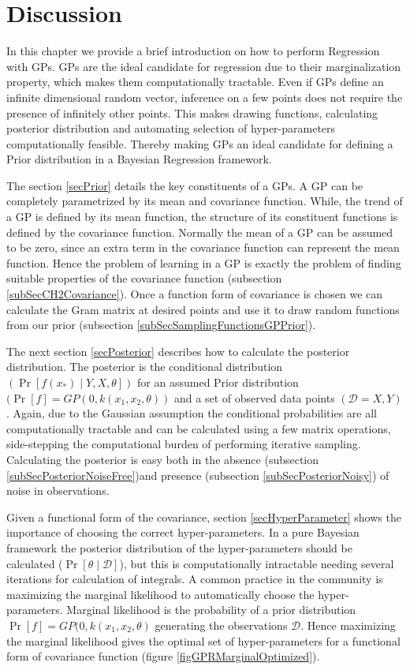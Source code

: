 \section{Discussion}\label{secCH2Discussion}
In this chapter we provide a brief introduction on how to perform Regression with GPs. GPs are the ideal candidate for regression due to their marginalization property, which makes them computationally tractable. Even if GPs define an infinite dimensional random vector, inference on a few points does not require the presence of infinitely other points. This makes drawing functions, calculating posterior distribution and automating selection of hyper-parameters computationally feasible. Thereby making GPs an ideal candidate for defining a Prior distribution in a Bayesian Regression framework. 

The section \ref{secPrior} details the key constituents of a GPs. A GP can be completely parametrized by its mean and covariance function. While, the trend of a GP is defined by its mean function, the structure of its constituent functions is defined by the covariance function. Normally the mean of a GP can be assumed to be zero, since an extra term in the covariance function can represent the mean function. Hence the problem of learning in a GP is exactly the problem of finding suitable properties of the covariance function (subsection \ref{subSecCH2Covariance}). Once a function form of covariance is chosen we can calculate the Gram matrix at desired points and use it to draw random functions from our prior (subsection \ref{subSecSamplingFunctionsGPPrior}). 

The next section \ref{secPosterior} describes how to calculate the posterior distribution. The posterior is the conditional distribution $(\Pr[f(x_{*}) \mid Y, X, \theta])$ for an assumed Prior distribution $(\Pr[f] = GP(0, k(x_{1}, x_{2}, \theta))$ and a set of observed data points $(\mathcal{D} = {X, Y})$. Again, due to the Gaussian assumption the conditional probabilities are all computationally tractable and can be calculated using a few matrix operations, side-stepping the computational burden of performing iterative sampling. Calculating the posterior is easy both in the absence (subsection \ref{subSecPosteriorNoiseFree})and presence (subsection \ref{subSecPosteriorNoisy}) of noise in observations. 

Given a functional form of the covariance, section \ref{secHyperParameter} shows the importance of choosing the correct hyper-parameters. In a pure Bayesian framework the posterior distribution of the hyper-parameters should be calculated ($\Pr[\theta \mid \mathcal{D}]$), but this is computationally intractable needing several iterations for calculation of integrals. A common practice in the community is maximizing the marginal likelihood to automatically choose the hyper-parameters. Marginal likelihood is the probability of a prior distribution $\Pr[f] = GP(0, k(x_{1}, x_{2}, \theta)$ generating the observations $\mathcal{D}$. Hence maximizing the marginal likelihood gives the optimal set of hyper-parameters for a functional form of covariance function (figure \ref{figGPRMarginalOptimized}). 

